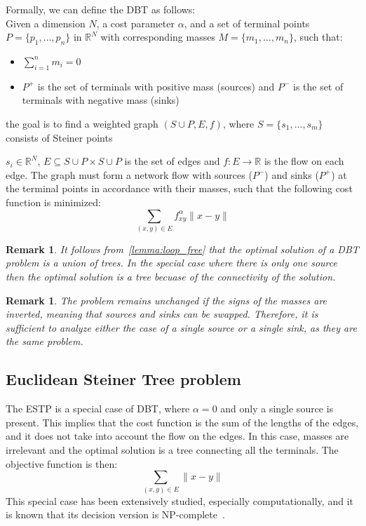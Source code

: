 \documentclass[11pt,reqno,a4paper]{amsart}
\numberwithin{equation}{section}
\theoremstyle{mytheorem}
\theoremstyle{myremark}
\newtheorem{remark}[subsection]{Remark}
\theoremstyle{myparagraph}
\newcommand{\R}{\mathbb{R}}
\begin{document}
    Formally, we can define the DBT as follows: \\
    Given a dimension $N$, a cost parameter $\alpha$, and a set of terminal points $P = \{p_1, \ldots, p_n\}$ in $\mathbb{R}^N$ with
    corresponding masses $M = \{m_1, \ldots, m_n\}$, such that:
    \begin{itemize}
        \item $\sum_{i=1}^{n} m_i = 0$
        \item $P^+$ is the set of terminals with positive mass (sources) and $P^-$ is the set of terminals with negative mass (sinks)
    \end{itemize}

    the goal is to find a weighted graph $(S \cup P, E, f)$, where $S = \{s_1, \ldots, s_m\}$
    consists of Steiner points


    $s_i \in \R^N$, $E \subseteq S \cup P \times S \cup P$ is the set of edges and
    $f : E \rightarrow \mathbb{R}$ is the flow on each edge.
    The graph must form a network flow with sources ($P^-$) and sinks ($P^+$) at the terminal points in accordance with their masses,
    such that the following cost function is minimized:
    \[
        \sum_{(x,y) \in E} f_{xy}^\alpha \|x - y\|
    \]

    \begin{remark}
        It follows from~\ref{lemma:loop_free} that the optimal solution of a DBT problem is a union of trees.
        In the special case where there is only one source then the optimal solution is a tree becuase of the connectivity
        of the solution.

    \end{remark}
    \begin{remark}

        The problem remains unchanged if the signs of the masses are inverted, meaning that sources and sinks can be swapped.
        Therefore, it is sufficient to analyze either the case of a single source or a single sink, as they are the same problem.

             \end{remark}

    \subsection{Euclidean Steiner Tree problem}

    The ESTP is a special case of DBT, where  $\alpha=0$ and only a single source is present.
    This implies that the cost function is the sum of the lengths of the edges, and it does not take into account the flow on the edges.
    In this case, masses are irrelevant and the optimal solution is a tree connecting all the terminals.
    The objective function is then:
    \begin{equation}
        \sum_{(x,y) \in E} \|x - y\|
    \end{equation}
     This special case has been extensively studied, especially computationally,
    and it is known that its decision version is NP-complete~\cite{karp2010reducibility}.
\end{document}
